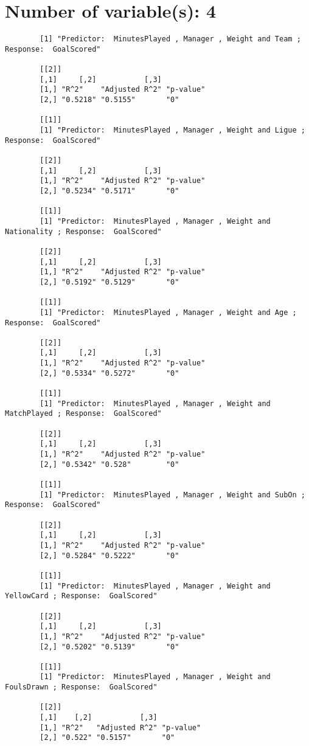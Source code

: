 \documentclass[12pt]{article}
\begin{document}
	\section{Number of variable(s): 4}
	\begin{verbatim}
		[1] "Predictor:  MinutesPlayed , Manager , Weight and Team ; Response:  GoalScored"
		
		[[2]]
		[,1]     [,2]           [,3]     
		[1,] "R^2"    "Adjusted R^2" "p-value"
		[2,] "0.5218" "0.5155"       "0"      
		
		[[1]]
		[1] "Predictor:  MinutesPlayed , Manager , Weight and Ligue ; Response:  GoalScored"
		
		[[2]]
		[,1]     [,2]           [,3]     
		[1,] "R^2"    "Adjusted R^2" "p-value"
		[2,] "0.5234" "0.5171"       "0"      
		
		[[1]]
		[1] "Predictor:  MinutesPlayed , Manager , Weight and Nationality ; Response:  GoalScored"
		
		[[2]]
		[,1]     [,2]           [,3]     
		[1,] "R^2"    "Adjusted R^2" "p-value"
		[2,] "0.5192" "0.5129"       "0"      
		
		[[1]]
		[1] "Predictor:  MinutesPlayed , Manager , Weight and Age ; Response:  GoalScored"
		
		[[2]]
		[,1]     [,2]           [,3]     
		[1,] "R^2"    "Adjusted R^2" "p-value"
		[2,] "0.5334" "0.5272"       "0"      
		
		[[1]]
		[1] "Predictor:  MinutesPlayed , Manager , Weight and MatchPlayed ; Response:  GoalScored"
		
		[[2]]
		[,1]     [,2]           [,3]     
		[1,] "R^2"    "Adjusted R^2" "p-value"
		[2,] "0.5342" "0.528"        "0"      
		
		[[1]]
		[1] "Predictor:  MinutesPlayed , Manager , Weight and SubOn ; Response:  GoalScored"
		
		[[2]]
		[,1]     [,2]           [,3]     
		[1,] "R^2"    "Adjusted R^2" "p-value"
		[2,] "0.5284" "0.5222"       "0"      
		
		[[1]]
		[1] "Predictor:  MinutesPlayed , Manager , Weight and YellowCard ; Response:  GoalScored"
		
		[[2]]
		[,1]     [,2]           [,3]     
		[1,] "R^2"    "Adjusted R^2" "p-value"
		[2,] "0.5202" "0.5139"       "0"      
		
		[[1]]
		[1] "Predictor:  MinutesPlayed , Manager , Weight and FoulsDrawn ; Response:  GoalScored"
		
		[[2]]
		[,1]    [,2]           [,3]     
		[1,] "R^2"   "Adjusted R^2" "p-value"
		[2,] "0.522" "0.5157"       "0"      
		

\end{verbatim}
\end{document}
